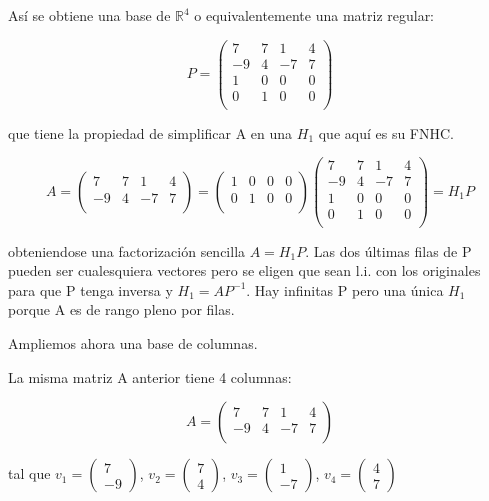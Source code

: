\documentclass[11pt, a4paper]{article}
\newif\IfInSansMode
\newcommand{\R}{\mathbb{R}} \newcommand{\N}{\mathbb{N}}
\theoremstyle{theorem-style}
\theoremstyle{definition-style}
\theoremstyle{remark-style}
\theoremstyle{example-style}
\begin{document}
Así se obtiene una base de $\R^4$ o equivalentemente una matriz regular:

$$P = \begin{pmatrix}
7 & 7 & 1 & 4 \\
-9 & 4 & -7 & 7 \\
1 & 0 & 0 & 0 \\
0 & 1 & 0 & 0 \\
\end{pmatrix}$$

que tiene la propiedad de simplificar A en una $H_1$ que aquí es su FNHC.

$$A = \begin{pmatrix}
7 & 7 & 1 & 4 \\
-9 & 4 & -7 & 7 \\
\end{pmatrix} = \begin{pmatrix}
1 & 0 & 0 & 0 \\
0 & 1 & 0 & 0 \\
\end{pmatrix} \begin{pmatrix}
7 & 7 & 1 & 4 \\
-9 & 4 & -7 & 7 \\
1 & 0 & 0 & 0 \\
0 & 1 & 0 & 0 \\
\end{pmatrix} = H_1P$$

obteniendose una factorización sencilla $A=H_1P$. Las dos últimas filas de P pueden ser cualesquiera vectores pero se eligen que sean l.i. con los originales para que P tenga inversa y $H_1=AP^{-1}$. Hay infinitas P pero una única $H_1$ porque A es de rango pleno por filas.

Ampliemos ahora una base de columnas.

La misma matriz A anterior tiene 4 columnas:

$$A = \begin{pmatrix}
7 & 7 & 1 & 4 \\
-9 & 4 & -7 & 7 \\
\end{pmatrix}$$ 

tal que $v_1 = \begin{pmatrix} 7 \\ -9 \end{pmatrix}$, $v_2 = \begin{pmatrix} 7 \\ 4 \end{pmatrix}$, $v_3 = \begin{pmatrix} 1 \\ -7 \end{pmatrix}$, $v_4 = \begin{pmatrix} 4 \\ 7 \end{pmatrix}$ \\
\end{document}
